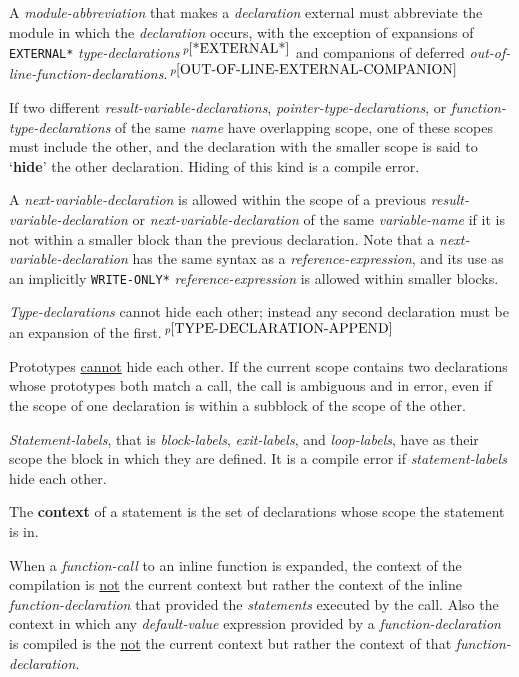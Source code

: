 \documentclass[12pt]{article}
\newcommand{\key}[1]{{\rm \bfseries #1}}
\newcommand{\pagnote}[1]{$\,^{p\pageref{#1}}$}
\begin{document}
A {\em module-abbreviation} that makes a {\em declaration} external
must abbreviate the module in which the {\em declaration} occurs,
with the exception of expansions of
{\tt *EXTERNAL*} {\em type-declar\-ations}\pagnote{*EXTERNAL*}
and companions of deferred
{\em out-of-line-function-declarations}.\pagnote{OUT-OF-LINE-EXTERNAL-COMPANION}

If two different {\em result-variable-declarations},
{\em pointer-type-declarations}, or {\em function-type-de\-clar\-a\-tions}
of the same {\em name} have overlapping
scope, one of these scopes must include the other,
and the declaration with the smaller scope is said to 
`\key{hide}'\label{HIDE} the other declaration.
Hiding of this kind is a compile error.

A {\em next-variable-declaration} is allowed
within the scope of a previous {\em result-variable-de\-clar\-a\-tion}
or {\em next-variable-declaration} of the same {\em variable-name}
if it is not within a smaller block than the previous declaration.
Note that a {\em next-variable-declaration} has
the same syntax as a {\em reference-expression}, and its use
as an implicitly {\tt *WRITE-ONLY*} {\em reference-expression}
is allowed within smaller blocks.

{\em Type-declarations} cannot hide each other; instead any second
declaration must be an expansion of
the first.\pagnote{TYPE-DECLARATION-APPEND}

Prototypes \underline{cannot} hide each other.  If the
current scope contains two declarations whose prototypes
both match a call, the call is ambiguous and in error,
even if the scope of one declaration is within
a subblock of the scope of the other.

{\em Statement-labels}, that is {\em block-labels},
{\em exit-labels}, and {\em loop-labels}, have as their scope
the block in which they are defined.  It is a compile
error if {\em statement-labels} hide each other.

The \key{context}\label{CONTEXT} of a statement is the set of declarations
whose scope the statement is in.

When a {\em function-call} to an inline function is expanded,
the context of the compilation is \underline{not} the current context but
rather the context of the inline {\em function-declaration}
that provided the {\em statements} executed by the call.
Also the context in which any {\em default-value} expression
provided by a {\em function-declaration} is compiled\label{DEFAULT-CONTEXT}
is the \underline{not} the current context but
rather the context of that {\em function-declaration}.
\end{document}
